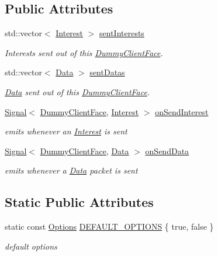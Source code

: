 \subsection*{Public Attributes}
\begin{DoxyCompactItemize}
\item 
std\+::vector$<$ \hyperlink{classndn_1_1Interest}{Interest} $>$ \hyperlink{classndn_1_1util_1_1DummyClientFace_a0abd6e1b6f8a0fcf525fc521509dafd5}{sent\+Interests}
\begin{DoxyCompactList}\small\item\em Interests sent out of this \hyperlink{classndn_1_1util_1_1DummyClientFace}{Dummy\+Client\+Face}. \end{DoxyCompactList}\item 
std\+::vector$<$ \hyperlink{classndn_1_1Data}{Data} $>$ \hyperlink{classndn_1_1util_1_1DummyClientFace_a34a36f52fa4a5c1380747eb0ff660c9f}{sent\+Datas}
\begin{DoxyCompactList}\small\item\em \hyperlink{classndn_1_1Data}{Data} sent out of this \hyperlink{classndn_1_1util_1_1DummyClientFace}{Dummy\+Client\+Face}. \end{DoxyCompactList}\item 
\hyperlink{classndn_1_1util_1_1signal_1_1Signal}{Signal}$<$ \hyperlink{classndn_1_1util_1_1DummyClientFace}{Dummy\+Client\+Face}, \hyperlink{classndn_1_1Interest}{Interest} $>$ \hyperlink{classndn_1_1util_1_1DummyClientFace_a1c28a5ebe1a4164c8f3f73584ef68d92}{on\+Send\+Interest}
\begin{DoxyCompactList}\small\item\em emits whenever an \hyperlink{classndn_1_1Interest}{Interest} is sent \end{DoxyCompactList}\item 
\hyperlink{classndn_1_1util_1_1signal_1_1Signal}{Signal}$<$ \hyperlink{classndn_1_1util_1_1DummyClientFace}{Dummy\+Client\+Face}, \hyperlink{classndn_1_1Data}{Data} $>$ \hyperlink{classndn_1_1util_1_1DummyClientFace_a8580730478c59a520b28cb87e6a1acf7}{on\+Send\+Data}
\begin{DoxyCompactList}\small\item\em emits whenever a \hyperlink{classndn_1_1Data}{Data} packet is sent \end{DoxyCompactList}\end{DoxyCompactItemize}
\subsection*{Static Public Attributes}
\begin{DoxyCompactItemize}
\item 
static const \hyperlink{structndn_1_1util_1_1DummyClientFace_1_1Options}{Options} \hyperlink{classndn_1_1util_1_1DummyClientFace_a4b7a8fe8f1bad715ad1df6ba68458dfb}{D\+E\+F\+A\+U\+L\+T\+\_\+\+O\+P\+T\+I\+O\+NS} \{ true, false \}
\begin{DoxyCompactList}\small\item\em default options \end{DoxyCompactList}\end{DoxyCompactItemize}
